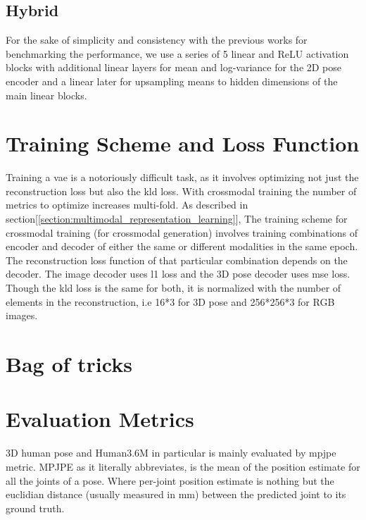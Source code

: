 \subsection{Hybrid} %
For the sake of simplicity and consistency with the previous works for benchmarking the performance, we use a series of 5 linear and ReLU activation blocks with additional linear layers for mean and log-variance for the 2D pose encoder and a linear later for upsampling means to hidden dimensions of the main linear blocks.

\section{Training Scheme and Loss Function} %
Training a \ac{vae} is a notoriously difficult task, as it involves optimizing not just the reconstruction loss but also the \ac{kld} loss. With crossmodal training the number of metrics to optimize increases multi-fold. As described in section[\ref{section:multimodal_representation_learning}], The training scheme for crossmodal training (for crossmodal generation) involves training combinations of encoder and decoder of either the same or different modalities in the same epoch. The reconstruction loss function of that particular combination depends on the decoder. The image decoder uses \ac{l1} loss and the 3D pose decoder uses \ac{mse} loss. Though the \ac{kld} loss is the same for both, it is normalized with the number of elements in the reconstruction, i.e 16*3 for 3D pose and 256*256*3 for RGB images.

\section{Bag of tricks} %
\lipsum[1-10] %

\section{Evaluation Metrics} %
3D human pose and Human3.6M in particular is mainly evaluated by \ac{mpjpe} metric. MPJPE as it literally abbreviates, is the mean of the position estimate for all the joints of a pose. Where per-joint position estimate is nothing but the euclidian distance (usually measured in mm) between the predicted joint to its ground truth.
